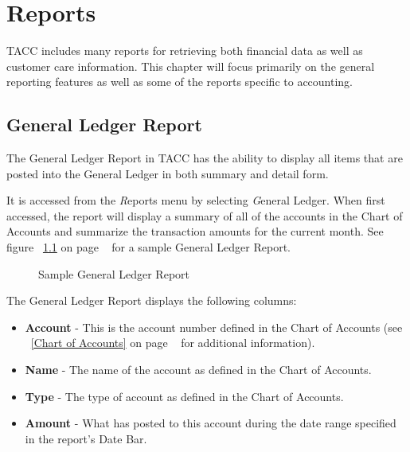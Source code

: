\chapter{Reports}

TACC includes many reports for retrieving both financial data as well as
customer care information.  This chapter will focus primarily on the
general reporting features as well as some of the reports specific to
accounting.



\section{General Ledger Report}

The General Ledger Report in TACC has the ability to display all items
that are posted into the General Ledger in both summary and detail form.

It is accessed from the {\emph Reports} menu by selecting {\emph General
Ledger}.  When first accessed, the report will display a summary of all
of the accounts in the Chart of Accounts and summarize the transaction
amounts for the current month.  See figure
~\ref{fig:GeneralLedgerReport} on page
~\pageref{fig:GeneralLedgerReport} for a sample General Ledger Report.

\begin{figure}[hbtp]
\caption{ \label{fig:GeneralLedgerReport} Sample General Ledger Report}
\end{figure}

The General Ledger Report displays the following columns:
\begin{itemize}
\item {\bf Account} - This is the account number defined in the Chart of
Accounts (see ~\ref{Chart of Accounts} on page ~\pageref{Chart of Accounts}
for additional information).
\item {\bf Name} - The name of the account as defined in the Chart of
Accounts.
\item {\bf Type} - The type of account as defined in the Chart of
Accounts.
\item {\bf Amount} - What has posted to this account during the date
range specified in the report's Date Bar.
\end{itemize}

